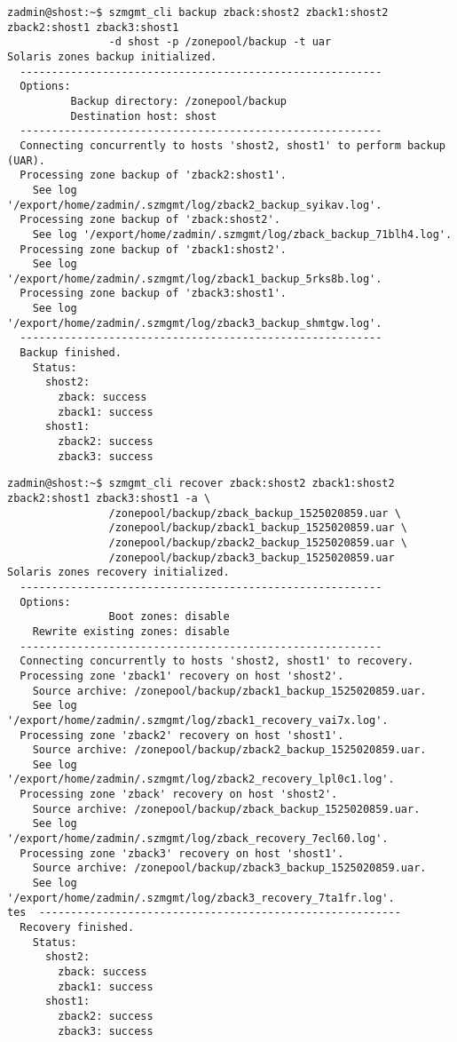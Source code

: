 \begin{lstlisting}[basicstyle=\scriptsize\ttfamily, caption={Vytvoření zálohy zón pomocí UAR}, float,label={code:test:backup}]  
zadmin@shost:~$ szmgmt_cli backup zback:shost2 zback1:shost2 zback2:shost1 zback3:shost1
                -d shost -p /zonepool/backup -t uar
Solaris zones backup initialized.
  ---------------------------------------------------------
  Options:
          Backup directory: /zonepool/backup
          Destination host: shost
  ---------------------------------------------------------
  Connecting concurrently to hosts 'shost2, shost1' to perform backup (UAR).
  Processing zone backup of 'zback2:shost1'. 
    See log '/export/home/zadmin/.szmgmt/log/zback2_backup_syikav.log'.
  Processing zone backup of 'zback:shost2'. 
    See log '/export/home/zadmin/.szmgmt/log/zback_backup_71blh4.log'.
  Processing zone backup of 'zback1:shost2'. 
    See log '/export/home/zadmin/.szmgmt/log/zback1_backup_5rks8b.log'.
  Processing zone backup of 'zback3:shost1'. 
    See log '/export/home/zadmin/.szmgmt/log/zback3_backup_shmtgw.log'.
  ---------------------------------------------------------
  Backup finished.
    Status:
      shost2:
        zback: success
        zback1: success
      shost1:
        zback2: success
        zback3: success
\end{lstlisting}
\begin{lstlisting}[basicstyle=\scriptsize\ttfamily, caption={Obnovení zón ze zálohy typu UAR}, float,label={code:test:recovery}]  
zadmin@shost:~$ szmgmt_cli recover zback:shost2 zback1:shost2 zback2:shost1 zback3:shost1 -a \ 
                /zonepool/backup/zback_backup_1525020859.uar \
                /zonepool/backup/zback1_backup_1525020859.uar \
                /zonepool/backup/zback2_backup_1525020859.uar \
                /zonepool/backup/zback3_backup_1525020859.uar
Solaris zones recovery initialized.
  ---------------------------------------------------------
  Options:
                Boot zones: disable
    Rewrite existing zones: disable
  ---------------------------------------------------------
  Connecting concurrently to hosts 'shost2, shost1' to recovery.
  Processing zone 'zback1' recovery on host 'shost2'.
    Source archive: /zonepool/backup/zback1_backup_1525020859.uar.
    See log '/export/home/zadmin/.szmgmt/log/zback1_recovery_vai7x.log'.
  Processing zone 'zback2' recovery on host 'shost1'.
    Source archive: /zonepool/backup/zback2_backup_1525020859.uar.
    See log '/export/home/zadmin/.szmgmt/log/zback2_recovery_lpl0c1.log'.
  Processing zone 'zback' recovery on host 'shost2'.
    Source archive: /zonepool/backup/zback_backup_1525020859.uar.
    See log '/export/home/zadmin/.szmgmt/log/zback_recovery_7ecl60.log'.
  Processing zone 'zback3' recovery on host 'shost1'.
    Source archive: /zonepool/backup/zback3_backup_1525020859.uar.
    See log '/export/home/zadmin/.szmgmt/log/zback3_recovery_7ta1fr.log'.
tes  ---------------------------------------------------------
  Recovery finished.
    Status:
      shost2:
        zback: success
        zback1: success
      shost1:
        zback2: success
        zback3: success
\end{lstlisting}
